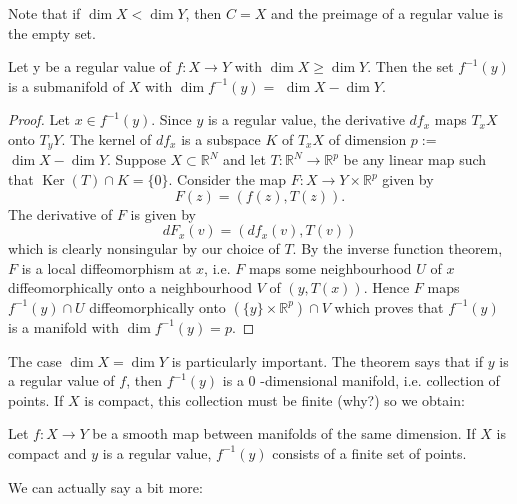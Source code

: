 \documentclass[a4paper]{scrartcl}
\begin{document}
\begin{remark}
    Note that if $\operatorname{dim} X<\operatorname{dim} Y$, then $C=X$ and the preimage of a regular value is the empty set.
\end{remark}

\begin{theorem}\label{thm:preimage}
    Let y be a regular value of $f: X \rightarrow Y$ with $\operatorname{dim} X \geq \operatorname{dim} Y$. Then the set $f^{-1}(y)$ is a submanifold of $X$ with $\operatorname{dim} f^{-1}(y)=$ $\operatorname{dim} X-\operatorname{dim} Y$.
\end{theorem}
\begin{proof}
    Let $x \in f^{-1}(y)$. Since $y$ is a regular value, the derivative $d f_{x}$ maps $T_{x} X$ onto $T_{y} Y$. The kernel of $d f_{x}$ is a subspace $K$ of $T_{x} X$ of dimension $p:=$ $\operatorname{dim} X-\operatorname{dim} Y$. Suppose $X \subset \mathbb{R}^{N}$ and let $T: \mathbb{R}^{N} \rightarrow \mathbb{R}^{p}$ be any linear map such that $\operatorname{Ker}(T) \cap K=\{0\}$. Consider the map $F: X \rightarrow Y \times \mathbb{R}^{p}$ given by
$$
F(z)=(f(z), T(z)).
$$
The derivative of $F$ is given by
$$
d F_{x}(v)=\left(d f_{x}(v), T(v)\right)
$$
which is clearly nonsingular by our choice of $T$. By the inverse function theorem, $F$ is a local diffeomorphism at $x$, i.e. $F$ maps some neighbourhood $U$ of $x$ diffeomorphically onto a neighbourhood $V$ of $(y, T(x))$. Hence $F$ maps $f^{-1}(y) \cap U$ diffeomorphically onto $\left(\{y\} \times \mathbb{R}^{p}\right) \cap V$ which proves that $f^{-1}(y)$ is a manifold with $\operatorname{dim} f^{-1}(y)=p$.
\end{proof}

The case $\operatorname{dim} X=\operatorname{dim} Y$ is particularly important. The theorem says that if $y$ is a regular value of $f$, then $f^{-1}(y)$ is a 0 -dimensional manifold, i.e. collection of points. If $X$ is compact, this collection must be finite (why?) so we obtain:

\begin{corollary}
    Let $f: X \rightarrow Y$ be a smooth map between manifolds of the same dimension. If $X$ is compact and $y$ is a regular value, $f^{-1}(y)$ consists of a finite set of points.
\end{corollary}

We can actually say a bit more:
\end{document}
